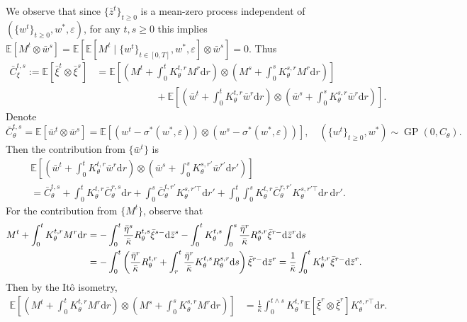 \documentclass[11pt,letterpaper,reqno]{amsart}
\theoremstyle{definition}
\def\eps{\varepsilon}
\def\d{\mathrm{d}}
\def\E{\mathbb{E}}
\def\GP{\operatorname{GP}}
\newcommand{\prn}[1]{\left({#1}\right)} %
\newcommand{\brk}[1]{\left[{#1}\right]} %
\begin{document}
We observe that since $\{\bar z^t\}_{t \geq 0}$ is a mean-zero process
independent of $(\{w^t\}_{t \geq 0},w^*,\eps)$, for any $t,s \geq 0$ this
implies
$\E[M^t \otimes \bar w^s] = \E[\E[M^t\mid \{w^t\}_{t\in [0,T]}, w^*, \eps]
\otimes \bar w^s ] = 0$. Thus
\begin{align*}
\bar C_\xi^{t,s}:=\E[\bar\xi^t \otimes \bar\xi^s]
&=\E\left[\left(M^t+\int_0^t K_\theta^{t,r}M^r \d r\right)
\otimes \left(M^s+\int_0^s K_\theta^{s,r}M^r \d r\right)\right]\\
&\hspace{1in}
+\E\left[\left(\bar w^t+\int_0^t K_\theta^{t,r}\bar w^r \d r\right)
\otimes \left(\bar w^s+\int_0^s K_\theta^{s,r}\bar w^r \d r\right)\right].
\end{align*}
Denote
\begin{equation}\label{eq:barCtheta}
\bar C_\theta^{t,s}=\E[\bar w^t \otimes \bar w^s]=\E[
(w^t-\sigma^*(w^*,\eps)) \otimes (w^s-\sigma^*(w^*,\eps))],
\quad (\{w^t\}_{t \geq 0},w^*) \sim \GP(0,C_\theta).
\end{equation}
Then the contribution from $\{\bar w^t\}$ is
\begin{align*}
&\E\brk{\prn{\bar w^t + \int_0^t K_\theta^{t,r}\bar w^r \d r} \otimes \prn{\bar w^s + \int_0^s K_\theta^{s,r'}\bar w^{r'} \d r'}} \\
&= \bar C_\theta^{t,s} + \int_0^t K_\theta^{t,r} \bar C_\theta^{r,s}\d r +
\int_0^s \bar C_\theta^{t,r'} K_\theta^{s,r'\top} \d r' + \int_0^t \int_0^s
K_\theta^{t,r}\bar C_\theta^{r,r'}K_\theta^{s,r'\top} \d r\,\d r'.
\end{align*}
For the contribution from $\{M^t\}$, observe that
\begin{align}
M^t + \int_0^t K_\theta^{t,r}M^r \d r &=  - \int_0^t
\frac{\bar\eta^s}{\bar\kappa} R_\theta^{t,s} \bar \xi^{s-}\d \bar z^s
- \int_0^t K_\theta^{t,s}\int_0^s \frac{\bar\eta^r}{\bar\kappa}
R_\theta^{s,r} \bar \xi^{r-}\d \bar z^r \d s\notag\\
&=  - \int_0^t  \prn{\frac{\bar\eta^r}{\bar\kappa} R_\theta^{t,r} + \int_r^t \frac{\bar\eta^r}{\bar\kappa} K_\theta^{t,s}   R_\theta^{s,r}\d s} \bar \xi^{r-}
\d \bar z^r
=\frac{1}{\bar\kappa}\int_0^t K_\theta^{t,r} \bar \xi^{r-}
\d \bar z^r.\label{eq:Midentity}
\end{align}
Then by the It\^o isometry,
\begin{align*}
\E\brk{\prn{M^t + \int_0^t K_\theta^{t,r}M^r \d r} \otimes \prn{M^s + \int_0^s K_\theta^{s,r}M^r \d r}}
&=\frac{1}{\bar\kappa}\int_0^{t\wedge s} K_\theta^{t,r} \E[\bar
\xi^r \otimes \bar \xi^r] K_\theta^{s,r\top} \d r.
\end{align*}
\end{document}
